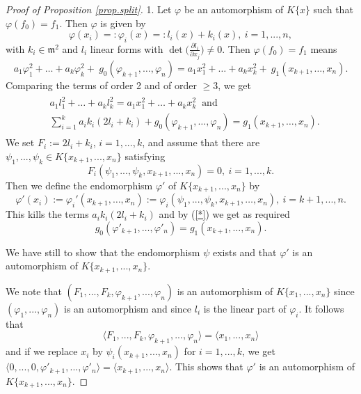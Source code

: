 \documentclass[11pt]{article}
\newcommand{\fm}{\mathfrak{m}}
\begin{document}
\begin{proof}[Proof of Proposition \ref{prop.split}] 
1.  Let 
 $\varphi$  be an automorphism  of $K\{x\}$ such that
$\varphi (f_0)= f_1$. Then
$\varphi$  is given by  
$$\varphi(x_i) =: \varphi_i(x) =: l_i(x)+k_i(x), \ i=1,...,n,$$ 
with $k_i \in \fm^2$ and $l_i$ linear forms with $\det \big(\frac{\partial l_i}{\partial x_j}\big) \ne 0$. Then $\varphi (f_0)= f_1$ means
$$
  a_1\varphi_1^2+\ldots+a_k\varphi_{k}^2+ \ g_0(\varphi_{k+1},\ldots,\varphi_n) =
 a_1x_1^2+\ldots+a_kx_{k}^2 + \ g_1(x_{k+1},\ldots,x_n).
$$
Comparing the terms of  order 2 and of order $\ge 3$,  we get
\begin{align}
\tag{*}\label{*}
\begin{split}
& a_1l_1^2+\ldots+a_kl_{k}^2   =  a_1x_1^2+\ldots+a_kx_k^2 \ \text{ and}  \\
 &\sum_{ i=1}^{k}  a_ik_{i} (2l_{i} + k_{i}) + g_0(\varphi_{k+1},\ldots,\varphi_n) = g_1(x_{k+1},\ldots,x_n).
 \end{split}
 \end{align}
We set $F_i := 2l_{i} + k_{i}$, $i = 1,...,k$, and assume that there are $\psi_1,...,\psi_{k} \in K\{ x_{k+1},...,x_n \}$ satisfying 
$$ F_i (\psi_1,...,\psi_{k}, x_{k+1},...,x_n)=0, \ i = 1,...,k.$$
Then we  define the endomorphism $\varphi'$ of $K\{x_{k+1},...,x_n \}$
by
 $$\varphi'(x_i):= \varphi_i'(x_{k+1},\ldots,x_n) := 
 \varphi_i(\psi_1,...,\psi_{k},x_{k+1},\ldots,x_n), \ i = k+1,...,n.$$ 
This kills the terms $ a_ik_{i} (2l_{i} + k_{i})$
and by (\ref{*}) we get as required
$$g_0(\varphi'_{k+1},\ldots,\varphi'_n) =
g_1(x_{k+1},\ldots,x_n).$$

We have still to show that the endomorphism 
 $\psi$ exists and that $\varphi'$ is an automorphism of  $K\{ x_{k+1},...,x_n \}$.

\noindent We note that $(F_1,...,F_{k}, \varphi_{k+1},...,\varphi_{n})$ 
 is an automorphism of $K\{ x_1,...,x_n \}$ 
 since 
 $(\varphi_1,...,\varphi_n)$ is an automorphism and since $l_i$ is the linear part of $\varphi_i$.
 It follows that 
 $$\langle F_1, ...,F_k,  \varphi_{k+1},...,\varphi_{n} \rangle = \langle x_{1} ,...,x_{n}\rangle$$
  and if we  replace $x_i$ by $\psi_i(x_{k+1},...,x_n)$ for $i=1,...,k$, we get 
  $\langle 0, ..., 0, \varphi'_{k+1},...,\varphi'_{n} \rangle = \langle x_{k+1} ,...,x_{n}\rangle$. This shows that $\varphi'$ is an automorphism of $K\{ x_{k+1},...,x_n\}$.
  

\end{proof}
\end{document}
